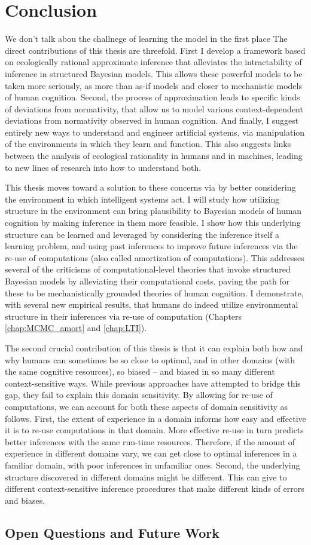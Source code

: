 \chapter{Conclusion}
\label{chap:conclusion}


We don't talk abou the challnege of learning the model in the first place
The direct contributions of this thesis are threefold. First I develop a framework based on ecologically rational approximate inference that alleviates the intractability of inference in structured Bayesian models. This allows these powerful models to be taken more seriously, as more than as-if models and closer to mechanistic models of human cognition. Second, the process of approximation leads to specific kinds of deviations from normativity, that allow us to model various context-dependent deviations from normativity observed in human cognition. And finally, I suggest entirely new ways to understand and engineer artificial systems, via manipulation of the environments in which they learn and function. This also suggests links between the analysis of ecological rationality in humans and in machines, leading to new lines of research into how to understand both.

This thesis moves toward a solution to these concerns via by better considering the environment in which intelligent systems act. I will study how utilizing structure in the environment can bring plausibility to Bayesian models of human cognition by making inference in them more feasible. I show how this underlying structure can be learned and leveraged by considering the inference itself a learning problem, and using past inferences to improve future inferences via the re-use of computations (also called amortization of computations). This addresses several of the criticisms of computational-level theories that invoke structured Bayesian models by alleviating their computational costs, paving the path for these to be mechanistically grounded theories of human cognition. I demonstrate, with several new empirical results, that humans do indeed utilize environmental structure in their inferences via re-use of computation (Chapters \ref{chap:MCMC_amort} and \ref{chap:LTI}). 

The second crucial contribution of this thesis is that it can explain both how and why humans can sometimes be so close to optimal, and in other domains (with the same cognitive resources), so biased -- and biased in so many different context-sensitive ways. While previous approaches have attempted to bridge this gap, they fail to explain this domain sensitivity. By allowing for re-use of computations, we can account for both these aspects of domain sensitivity as follows. First, the extent of experience in a domain informs how easy and effective it is to re-use computations in that domain. More effective re-use in turn predicts better inferences with the same run-time resources. Therefore, if the amount of experience in different domains vary, we can get close to optimal inferences in a familiar domain, with poor inferences in unfamiliar ones. Second, the underlying structure discovered in different domains might be different. This can give to different context-sensitive inference procedures that make different kinds of errors and biases.

\section*{Open Questions and Future Work}